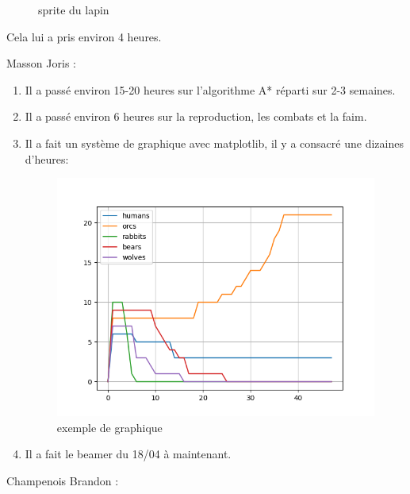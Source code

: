 \documentclass[a4paper, 11pt]{article}
\begin{document}
\begin{enumerate}
\begin{figure}[ht!]
 \caption{sprite du lapin}
 \label{fig::example::one}
\end{figure}
Cela lui a pris environ 4 heures.
\end{enumerate}
\newpage
Masson Joris : \\
\begin{enumerate}
\item Il a passé environ 15-20 heures sur l’algorithme  A* réparti sur 2-3 semaines.\\
\item Il a passé environ 6 heures sur la reproduction, les combats et la faim.\\
\item Il a fait un système de graphique avec matplotlib, il y a consacré une dizaines d'heures:\\
\begin{figure}[ht!]
 \centering
 \includegraphics[width=1\linewidth]{images/graph.png}
 \caption{exemple de graphique}
 \label{fig::example::one}
\end{figure}
\item Il a fait le beamer du 18/04 à maintenant.\\
\end{enumerate}
\newpage
Champenois Brandon : \\
\end{document}
